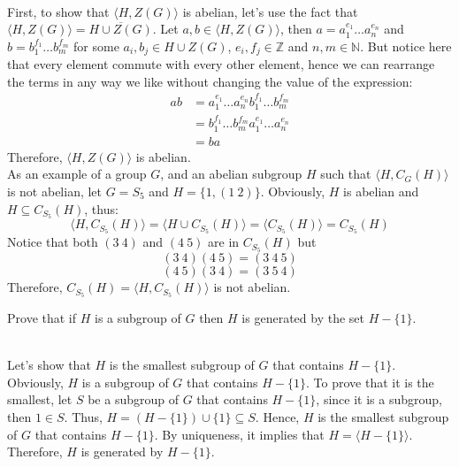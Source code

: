 \begin{solution}
    \\ First, to show that $\langle H, Z(G) \rangle$ is abelian, let's use the fact that $ \langle H, Z(G) \rangle = \overline{H\cup Z(G)}$. Let $a,b \in \langle H, Z(G) \rangle$, then $a = a_1^{e_1}\dots a_n^{e_n}$ and $b = b_1^{f_1}\dots b_m^{f_m}$ for some $a_i,b_j \in H\cup Z(G)$, $e_i,f_j \in \mathbb{Z}$ and $n,m \in \mathbb{N}$. But notice here that every element commute with every other element, hence we can rearrange the terms in any way we like without changing the value of the expression:
    \begin{align*}
        ab &= a_1^{e_1}\dots a_n^{e_n}b_1^{f_1}\dots b_m^{f_m} \\
        &= b_1^{f_1}\dots b_m^{f_m}a_1^{e_1}\dots a_n^{e_n} \\
        &= ba
    \end{align*}
    Therefore, $\langle H, Z(G) \rangle$ is abelian. \\
    As an example of a group $G$, and an abelian subgroup $H$ such that $\langle H, C_G(H) \rangle$ is not abelian, let $G = S_5$ and $H = \{1, (1 \ 2)\}$. Obviously, $H$ is abelian and $H \subseteq C_{S_5}(H)$, thus: 
    $$\langle H, C_{S_5}(H) \rangle = \langle H\cup C_{S_5}(H)\rangle = \langle C_{S_5}(H) \rangle = C_{S_5}(H)$$
    Notice that both $(3 \ 4)$ and $(4 \ 5)$ are in $C_{S_5}(H)$ but 
    $$(3 \ 4)(4 \ 5) = (3 \ 4 \ 5)$$
    $$(4 \ 5)(3 \ 4) = (3 \ 5 \ 4)$$
    Therefore, $C_{S_5}(H) = \langle H, C_{S_5}(H) \rangle$ is not abelian.
    \\
\end{solution}

\begin{exercise}
    Prove that if $H$ is a subgroup of $G$ then $H$ is generated by the set $H - \{1\}$. \\
\end{exercise}

\begin{solution}
    \\ Let's show that $H$ is the smallest subgroup of $G$ that contains $H - \{1\}$. Obviously, $H$ is a subgroup of $G$ that contains $H - \{1\}$. To prove that it is the smallest, let $S$ be a subgroup of $G$ that contains $H - \{1\}$, since it is a subgroup, then $1 \in S$. Thus, $H = (H - \{1\})\cup \{1\} \subseteq S$. Hence, $H$ is the smallest subgroup of $G$ that contains $H-\{1\}$. By uniqueness, it implies that $H = \langle H - \{1\} \rangle$. Therefore, $H$ is generated by $H - \{1\}$.\\
\end{solution}

